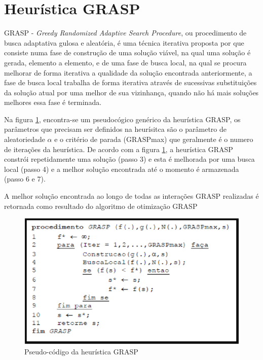 \section{Heurística GRASP}
GRASP - {\it Greedy Randomized Adaptive Search Procedure}, ou procedimento de busca adaptativa gulosa e aleatória, é uma técnica iterativa proposta por  que consiste numa fase de construção de uma solução viável, na qual uma solução é gerada, elemento a elemento, e de uma fase de busca local, na qual se procura melhorar de forma iterativa a qualidade da solução encontrada anteriormente, a fase de busca local trabalha de forma iterativa através de sucessivas substituições da solução atual por uma melhor de sua vizinhança, quando não há mais soluções melhores essa fase é terminada.

Na figura \ref{grasp}, encontra-se um pseudocógico genérico da heurística GRASP, os parâmetros que precisam ser definidos na heurísitca são o parâmetro de aleatoriedade $\alpha$ e o critério de parada (GRASPmax) que geralmente é o numero de iterações da heurística. De acordo com a figura \ref{grasp}, a heurística GRASP constrói repetidamente uma solução (passo 3) e esta é melhorada por uma busca local (passo 4) e a melhor solução encontrada até o momento é armazenada (passo 6 e 7).

A melhor solução encontrada ao longo de todas as interações GRASP realizadas é retornada como resultado do algoritmo de otimização GRASP \cite{SOUZA}

\begin{figure}[H]
\centering
\includegraphics[scale = 0.8]{graficos/grasp.eps}  
\caption{Pseudo-código da heurística GRASP}

\label{grasp}
\end{figure}

